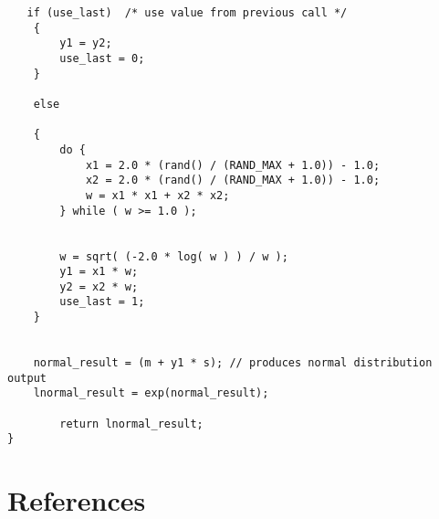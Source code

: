 \documentclass[5p]{elsarticle}
\begin{document}
\begin{lstlisting}
   if (use_last)  /* use value from previous call */
	{
		y1 = y2;
		use_last = 0;
	}
	
	else
	
	{
		do {
			x1 = 2.0 * (rand() / (RAND_MAX + 1.0)) - 1.0;
			x2 = 2.0 * (rand() / (RAND_MAX + 1.0)) - 1.0;
			w = x1 * x1 + x2 * x2;
		} while ( w >= 1.0 );


		w = sqrt( (-2.0 * log( w ) ) / w );
		y1 = x1 * w;
		y2 = x2 * w;
		use_last = 1;
	}


	normal_result = (m + y1 * s); // produces normal distribution output
	lnormal_result = exp(normal_result);

        return lnormal_result;
}

\end{lstlisting}





\section*{References}


\end{document}
